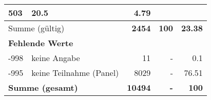 \begin{longtable}{lXrrr}
       \num{503} &
       \num[round-mode=places,round-precision=2]{20,5} &
         \num[round-mode=places,round-precision=2]{4,79} \\
     \midrule
     \multicolumn{2}{l}{Summe (gültig)} &
       \textbf{\num{2454}} &
     \textbf{100} &
       \textbf{\num[round-mode=places,round-precision=2]{23,38}} \\
     \multicolumn{5}{l}{\textbf{Fehlende Werte}}\\
       -998 &
       keine Angabe &
         \num{11} &
        - &
         \num[round-mode=places,round-precision=2]{0,1} \\
       -995 &
       keine Teilnahme (Panel) &
         \num{8029} &
        - &
         \num[round-mode=places,round-precision=2]{76,51} \\
     \midrule
     \multicolumn{2}{l}{\textbf{Summe (gesamt)}} &
          \textbf{\num{10494}} &
        \textbf{-} &
        \textbf{100} \\
     \bottomrule
     \end{longtable}
     
